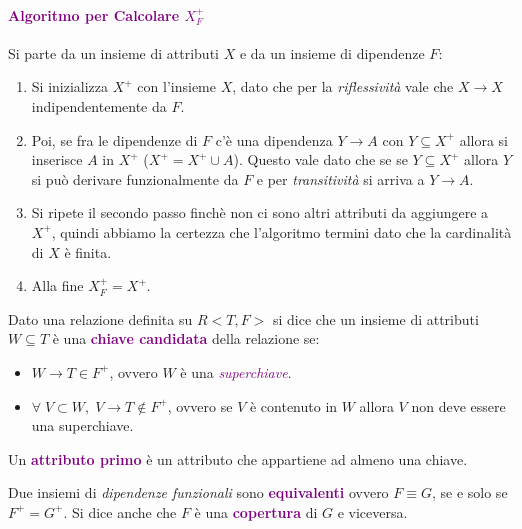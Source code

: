 \paragraph{\textcolor{purple}{Algoritmo per Calcolare $X_{F}^+$}}
Si parte da un insieme di attributi $X$ e da un insieme di dipendenze $F$:
\begin{enumerate}
    \item Si inizializza $X^+$ con l'insieme $X$, dato che per la \emph{riflessività}
        vale che $X \rightarrow X$ indipendentemente da $F$.
    \item Poi, se fra le dipendenze di $F$ c'è una dipendenza $Y \rightarrow A$ con
        $Y \subseteq X^+$ allora si inserisce $A$ in $X^+$ ($X^+ = X^+ \cup {A}$). Questo
        vale dato che se se $Y \subseteq X^+$ allora $Y$ si può derivare funzionalmente da $F$ e
        per \emph{transitività} si arriva a $Y \rightarrow A$.
    \item Si ripete il secondo passo finchè non ci sono altri attributi da aggiungere a $X^+$, quindi abbiamo
        la certezza che l'algoritmo termini dato che la cardinalità di $X$ è finita.
    \item Alla fine $X_{F}^+ = X^+$.
\end{enumerate}

\begin{definition}
    Dato una relazione definita su $R<T, F>$ si dice che un insieme
    di attributi $W \subseteq T$ è una \textbf{\textcolor{purple}{chiave candidata}}
    della relazione se:
    \begin{itemize}
        \item $W \rightarrow T \in F^+$, ovvero $W$ è una \emph{\textcolor{purple}{superchiave}}.
        \item $\forall \; V \subset W, \; V \rightarrow T \not\in F^+$, ovvero se $V$ è contenuto
            in $W$ allora $V$ non deve essere una superchiave.
    \end{itemize}
\end{definition}

\begin{definition}
    Un \textbf{\textcolor{purple}{attributo primo}} è un attributo che appartiene
    ad almeno una chiave.
\end{definition}

\begin{definition}[Copertura]
    Due insiemi di \emph{dipendenze funzionali} sono \textbf{\textcolor{purple}{equivalenti}}
    ovvero $F \equiv G$, se e solo se $F^+ = G^+$. Si dice anche che $F$ è
    una \textbf{\textcolor{purple}{copertura}} di $G$ e viceversa.
\end{definition}

